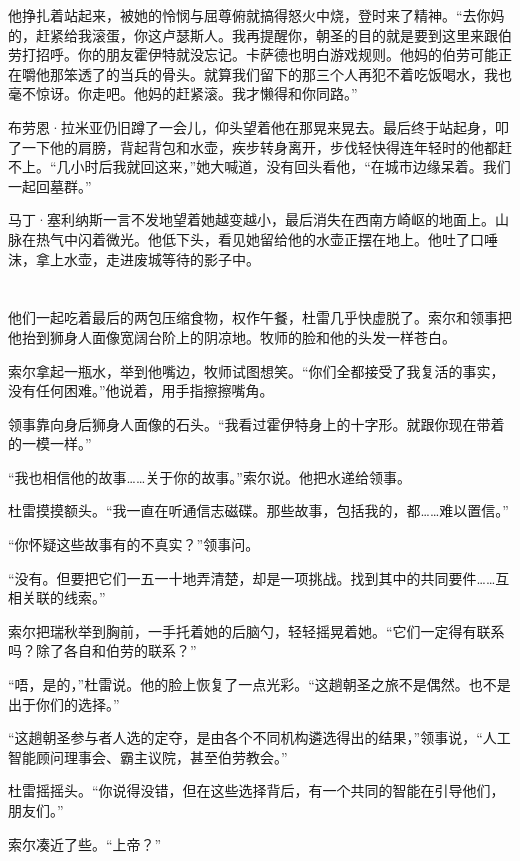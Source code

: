 \documentclass[AutoFakeBold=true]{book}
\begin{document}
他挣扎着站起来，被她的怜悯与屈尊俯就搞得怒火中烧，登时来了精神。``去你妈的，赶紧给我滚蛋，你这卢瑟斯人。我再提醒你，朝圣的目的就是要到这里来跟伯劳打招呼。你的朋友霍伊特就没忘记。卡萨德也明白游戏规则。他妈的伯劳可能正在嚼他那笨透了的当兵的骨头。就算我们留下的那三个人{\kaishu 再犯不着}吃饭喝水，我也毫不惊讶。你走吧。他妈的赶紧滚。我才懒得和你同路。''

布劳恩·拉米亚仍旧蹲了一会儿，仰头望着他在那晃来晃去。最后终于站起身，叩了一下他的肩膀，背起背包和水壶，疾步转身离开，步伐轻快得连年轻时的他都赶不上。``几小时后我就回这来，''她大喊道，没有回头看他，``在城市边缘呆着。我们一起回墓群。''

马丁·塞利纳斯一言不发地望着她越变越小，最后消失在西南方崎岖的地面上。山脉在热气中闪着微光。他低下头，看见她留给他的水壶正摆在地上。他吐了口唾沫，拿上水壶，走进废城等待的影子中。

\chapter{}

他们一起吃着最后的两包压缩食物，权作午餐，杜雷几乎快虚脱了。索尔和领事把他抬到狮身人面像宽阔台阶上的阴凉地。牧师的脸和他的头发一样苍白。

索尔拿起一瓶水，举到他嘴边，牧师试图想笑。``你们全都接受了我复活的事实，没有任何困难。''他说着，用手指擦擦嘴角。

领事靠向身后狮身人面像的石头。``我看过霍伊特身上的十字形。就跟你现在带着的一模一样。''

``我也相信他的故事……{\kaishu 关于你的}故事。''索尔说。他把水递给领事。

杜雷摸摸额头。``我一直在听通信志磁碟。那些故事，包括我的，都……难以置信。''

``你怀疑这些故事有的不真实？''领事问。

``没有。但要把它们一五一十地弄清楚，却是一项挑战。找到其中的共同要件……互相关联的线索。''

索尔把瑞秋举到胸前，一手托着她的后脑勺，轻轻摇晃着她。``它们一定得有联系吗？除了各自和伯劳的联系？''

``唔，是的，''杜雷说。他的脸上恢复了一点光彩。``这趟朝圣之旅不是偶然。也不是出于你们的选择。''

``这趟朝圣参与者人选的定夺，是由各个不同机构遴选得出的结果，''领事说，``人工智能顾问理事会、霸主议院，甚至伯劳教会。''

杜雷摇摇头。``你说得没错，但在这些选择背后，有一个共同的智能在引导他们，朋友们。''

索尔凑近了些。``上帝？''
\end{document}
